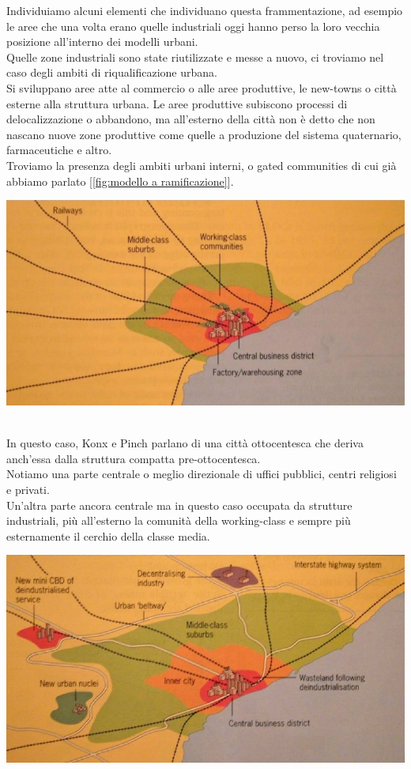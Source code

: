 \documentclass[a4paper,12pt, oneside]{book}
\begin{document}
  Individuiamo alcuni elementi che individuano questa frammentazione, ad esempio le aree che una volta erano quelle industriali oggi hanno perso la loro vecchia posizione all'interno dei modelli urbani.\\
  Quelle zone industriali sono state riutilizzate e messe a nuovo, ci troviamo nel caso degli ambiti di riqualificazione urbana.\\
  Si sviluppano aree atte al commercio o alle aree produttive, le new-towns o città esterne alla struttura urbana. Le aree produttive subiscono processi di delocalizzazione o abbandono, ma all'esterno della città non è detto che non nascano nuove zone produttive come quelle a produzione del sistema quaternario, farmaceutiche e altro.\\
  Troviamo la presenza degli ambiti urbani interni, o gated communities di cui già abbiamo parlato [\ref{fig:modello a ramificazione}].\\
  \begin{center}
  	\includegraphics[width=0.6\linewidth]{"immagini/konx and pich 2000"}
  	\label{fig:konx and pich 20000}
  \end{center}
  \leavevmode\\
  In questo caso, Konx e Pinch parlano di una città ottocentesca che deriva anch'essa dalla struttura compatta pre-ottocentesca.\\
  Notiamo una parte centrale o meglio direzionale di uffici pubblici, centri religiosi e privati.\\
  Un'altra parte ancora centrale ma in questo caso occupata da strutture industriali, più all'esterno la comunità della working-class e sempre più esternamente il cerchio della classe media.\\
  \begin{center}
  	\includegraphics[width=0.6\linewidth]{"immagini/konx and pinch post industrial"}
  	\label{fig:konx and pinch post industrial}
  \end{center}
\end{document}
